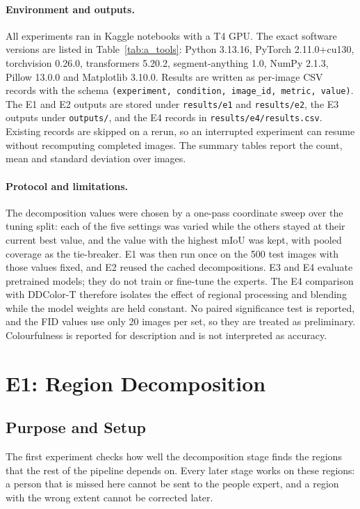 \documentclass{FastFyp}
\begin{document}
\paragraph{Environment and outputs.}
All experiments ran in Kaggle notebooks with a T4 GPU. The exact software
versions are listed in Table~\ref{tab:a_tools}: Python 3.13.16, PyTorch
2.11.0+cu130, torchvision 0.26.0, transformers 5.20.2, segment-anything 1.0,
NumPy 2.1.3, Pillow 13.0.0 and Matplotlib 3.10.0. Results are written as
per-image CSV records with the schema
\texttt{(experiment, condition, image\_id, metric, value)}. The E1 and E2
outputs are stored under \texttt{results/e1} and \texttt{results/e2}, the E3
outputs under \texttt{outputs/}, and the E4 records in
\texttt{results/e4/results.csv}. Existing records are skipped on a rerun, so an
interrupted experiment can resume without recomputing completed images. The
summary tables report the count, mean and standard deviation over images.

\paragraph{Protocol and limitations.}
The decomposition values were chosen by a one-pass coordinate sweep over the
tuning split: each of the five settings was varied while the others stayed at
their current best value, and the value with the highest mIoU was kept, with
pooled coverage as the tie-breaker. E1 was then run once on the 500 test images
with those values fixed, and E2 reused the cached decompositions. E3 and E4
evaluate pretrained models; they do not train or fine-tune the experts. The E4
comparison with DDColor-T therefore isolates the effect of regional processing
and blending while the model weights are held constant. No paired significance
test is reported, and the FID values use only 20 images per set, so they are
treated as preliminary. Colourfulness is reported for description and is not
interpreted as accuracy.

\section{E1: Region Decomposition}
\label{sec:e1-decomposition}

\subsection{Purpose and Setup}
The first experiment checks how well the decomposition stage finds the regions that the rest of the pipeline depends on. Every later stage works on these regions: a person that is missed here cannot be sent to the people expert, and a region with the wrong extent cannot be corrected later.
 
\end{document}
